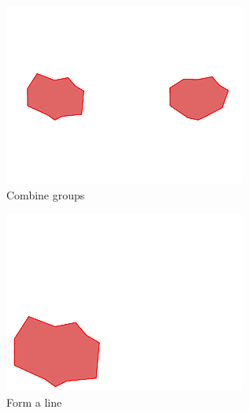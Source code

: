 \documentclass[]{article}
\begin{document}
\begin{figure}
	\ContinuedFloat
	\centering
	\begin{subfigure}{0.42\textwidth}
		\centering
		\includegraphics[width=\linewidth]{slide_images/Swarm_Robot_Control_-_Unknown_Number_of_Robots_0021.png}
		\caption{Combine groups}
		\label{fig:sub1}
	\end{subfigure}%
	\begin{subfigure}{0.42\textwidth}
		\centering
		\includegraphics[width=\linewidth]{slide_images/Swarm_Robot_Control_-_Unknown_Number_of_Robots_0023.png}
		\caption{Form a line}
		\label{fig:sub2}
	\end{subfigure}
	\begin{subfigure}{0.42\textwidth}

\end{subfigure}
\end{figure}
\end{document}
